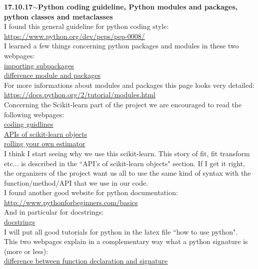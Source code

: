 \documentclass[11pt,a4paper]{article}
\newenvironment{loggentry}[2]%
{\noindent\textbf{#1}\hspace{1cm}$\mathbf{\sim}$\text{ }\textbf{#2}\\}{\vspace{0.5cm}}
\begin{document}
\begin{loggentry}{17.10.17}{Python coding guideline, Python modules and packages, python classes and metaclasses}
I found this general guideline for python coding style:\\
\url{https://www.python.org/dev/peps/pep-0008/}\\
I learned a few things concerning python packages and modules in these two webpages:\\
\href{https://stackoverflow.com/questions/9048518/importing-packages-in-python#9049246}{importing subpackages}\\
\href{https://stackoverflow.com/questions/7948494/whats-the-difference-between-a-python-module-and-a-python-package#7948672}{difference module and packages}\\
For more informations about modules and packages this page looks very detailed:\\
\url{https://docs.python.org/2/tutorial/modules.html}\\
Concerning the Scikit-learn part of the project we are encouraged to read the following webpages:\\
\href{http://scikit-learn.org/stable/developers/contributing.html#coding-guidelines}{coding guidlines}\\
\href{http://scikit-learn.org/stable/developers/contributing.html#apis-of-scikit-learn-objects}{APIs of scikit-learn objects}\\
\href{http://scikit-learn.org/stable/developers/contributing.html#rolling-your-own-estimator}{rolling your own estimator}\\
I think I start seeing why we use this scikit-learn. This story of fit, fit transform etc... is described in the ``API's of scikit-learn objects" section. If I get it right, the organizers of the project want us all to use the same kind of syntax with the function/method/API that we use in our code.\\
I found another good website for python documentation:
\url{http://www.pythonforbeginners.com/basics}\\
And in particular for docstrings:\\
\href{http://www.pythonforbeginners.com/basics/python-docstrings/}{docstrings}\\
I will put all good tutorials for python in the latex file ``how to use python".\\
This two webpages explain in a complementary way what a python signature is (more or less):\\
\href{https://stackoverflow.com/questions/2322736/what-is-the-difference-between-function-declaration-and-signature#2323005}{difference between function declaration and signature}\\

\end{loggentry}
\end{document}
